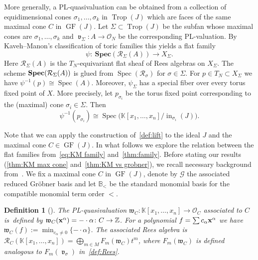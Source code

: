 \documentclass[10pt,a4paper]{amsart}
\newcommand{\thref}[1]{\ref{#1}}
\newtheorem{Definition}[Theorem]{Definition}
\numberwithin{equation}{section}
\DeclareMathOperator{\init}{in}
\DeclareMathOperator{\GF}{GF}
\DeclareMathOperator{\trop}{Trop}
\DeclareMathOperator{\val}{\mathfrak v}
\begin{document}
More generally, a PL-quasivaluation can be obtained from a collection of equidimensional cones $\sigma_1,\dots,\sigma_k$ in $\trop(J)$ which are faces of the same maximal cone $C$ in $\GF(J)$.
Let $\Sigma\subset \trop(J)$ be the subfan whose maximal cones are $\sigma_1,\dots,\sigma_k$ and $\val_{\Sigma}\colon A \to \mathcal O_N$ be the corresponding PL-valuation.
By Kaveh--Manon's classification of toric families this yields a flat family
\begin{equation}\label{eq:KM family}
\psi\colon\ \mathbf{Spec}(\mathcal R_\Sigma(A))\to X_\Sigma.
\end{equation}
Here $\mathcal R_\Sigma(A)$ is the $T_N$-equivariant flat sheaf of Rees algebras on $X_\Sigma$.
The scheme ${\bf Spec}(\mathcal{R}_{\Sigma}(A))$ is glued from $\operatorname{Spec}(\mathcal{R}_{\sigma})$ for $\sigma \in \Sigma$.
For $p\in T_N\subset X_{\Sigma}$ we have $\psi^{-1}(p)\cong \operatorname{Spec}(A)$.
Moreover, $\psi_\Sigma$ has a special fiber over every torus fixed point of $X$. More precisely, let $p_{\sigma_i}$ be the torus fixed point corresponding to the (maximal) cone $\sigma_i\in\Sigma$. Then
\begin{equation}\label{eq:fibers psi}
\psi^{-1}(p_{\sigma_i})\cong \operatorname{Spec}\big(\mathbb K[x_1,\dots,x_n]/\init_{\sigma_i}(J)\big).
\end{equation}



Note that we can apply the construction of~\thref{def:lift} to the ideal $J$ and the maximal cone $C\in \GF(J)$.
In what follows we explore the relation between the flat families from~\eqref{eq:KM family} and~\thref{thm:family}.
Before stating our results (\thref{thm:KM max cone} and~\thref{thm:KM vs grobner}), we recall necessary background from~\cite{KM-toricbundles}.
We fix a maximal cone $C$ in $\GF(J)$, denote by $\mathcal G$ the associated reduced Gr\"obner basis and let $\mathbb B_<$ be the standard monomial basis for the compatible monomial term order $<$.

\begin{Definition}[\cite{KM-toricbundles}]
The PL-quasivaluation $\mathfrak{w}_C\colon \mathbb K[x_1,\dots,x_n]\to \mathcal O_C$ associated to $C$ is~defi\-ned by $\mathfrak{w}_C({\bf x}^\alpha)= -\cdot \alpha\colon C\to \mathbb Z$.
For a polynomial $f=\sum c_\alpha {\bf x}^\alpha$ we have $\mathfrak{w}_C(f):=\min_{c_\alpha\not =0}\{ -\cdot \alpha\}$.
The associated Rees algebra is $\mathcal R_C(\mathbb K[x_1,\dots,x_n])=\bigoplus_{m\in M} F_m(\mathfrak{w}_C)t^m$, where
$F_m(\mathfrak{w}_C)$ is defined analogous to $F_m(\val_\sigma)$ in~\thref{def:Rees}.
\end{Definition}
\end{document}
